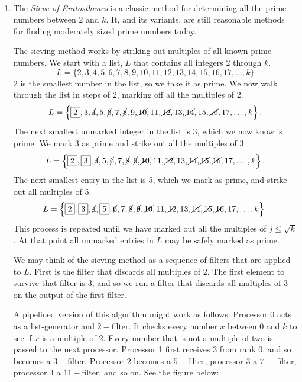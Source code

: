 \documentclass{article}
\renewcommand{\c}[1]{\cancel{#1}}
\begin{document}
\\
\begin{enumerate}
\item The \textit{Sieve of Eratosthenes} is a classic method for
  determining all the prime numbers between $2$ and $k$.  It, and its variants, are
  still reasonable methods for finding moderately sized prime numbers
  today.  

  The sieving method works by striking out multiples of all known
  prime numbers.  We start with a list, $L$ that contains all integers
  2 through $k$.  
\[L=\{2,3,4,5,6,7,8,9,10,11,12,13,14,15,16,17,\dots,k\}\]
2 is the smallest number in the list, so we take it as prime.  We now
walk through the list in steps of 2, marking off all the multiples of
2. 
\[L=\left\{\boxed{2},3,\c{4},5,\c{6},7,\c{8},9,\c{10},11,\c{12},13,\c{14},15,\c{16},17,\dots,k\right\}.\]
The next smallest unmarked integer in the list is 3, which we now
know is prime. We mark $3$ as prime and strike out all the multiples
of 3. 
\[L=\left\{\boxed{2},\boxed{3},\c{4},5,\c{6},7,\c{8},\c{9},\c{10},11,\c{12},13,\c{14},\c{15},\c{16},17,\dots,k\right\}.\]
The next smallest entry in the list is 5, which we mark as prime, and
strike out all multiples of 5. 
\[L=\left\{\boxed{2},\boxed{3},\c{4},\boxed{5},\c{6},7,\c{8},\c{9},\c{10},11,\c{12},13,\c{14},\c{15},\c{16},17,\dots,k\right\}.\]
This process is repeated until we have marked out all the multiples of
$j\le\sqrt{k}$. At that point all unmarked entries in $L$ may be
safely marked as prime. 

We may think of the sieving method as a sequence of filters that are
applied to $L$.  First is the filter that discards all multiples of
2.  The first element to survive that filter is 3, and so we run a
filter that discards all multiples of 3 on the output of the first
filter. 

A pipelined version of this algorithm might work as follows: Processor
0 acts as a list-generator and $2-$filter.  It checks every number $x$
between $0$ and $k$ to see if $x$ is a multiple of 2. Every number
that is not a multiple of two is passed to the next processor.
Processor 1 first receives 3 from rank 0, and so becomes a
$3-$filter.  Processor $2$ becomes a $5-$filter, processor $3$ a $7-$
filter, processor $4$ a $11-$filter, and so on. See the figure below:


\end{enumerate}
\end{document}
